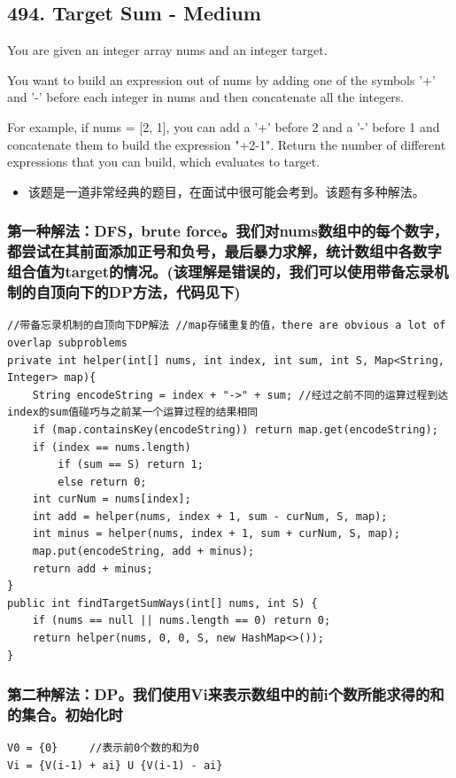 \documentclass[9pt, b5paper]{article}
\begin{document}
\subsection{494. Target Sum - Medium}
\label{sec-4-35}
You are given an integer array nums and an integer target.

You want to build an expression out of nums by adding one of the symbols '+' and '-' before each integer in nums and then concatenate all the integers.

For example, if nums = [2, 1], you can add a '+' before 2 and a '-' before 1 and concatenate them to build the expression "+2-1".
Return the number of different expressions that you can build, which evaluates to target.
\begin{itemize}
\item 该题是一道非常经典的题目，在面试中很可能会考到。该题有多种解法。
\end{itemize}
\subsubsection{第一种解法：DFS，brute force。我们对nums数组中的每个数字，都尝试在其前面添加正号和负号，最后暴力求解，统计数组中各数字组合值为target的情况。(该理解是错误的，我们可以使用带备忘录机制的自顶向下的DP方法，代码见下)}
\label{sec-4-35-1}
\begin{verbatim}
//带备忘录机制的自顶向下DP解法 //map存储重复的值，there are obvious a lot of overlap subproblems
private int helper(int[] nums, int index, int sum, int S, Map<String, Integer> map){ 
    String encodeString = index + "->" + sum; //经过之前不同的运算过程到达index的sum值碰巧与之前某一个运算过程的结果相同
    if (map.containsKey(encodeString)) return map.get(encodeString);
    if (index == nums.length)
        if (sum == S) return 1;
        else return 0;
    int curNum = nums[index];
    int add = helper(nums, index + 1, sum - curNum, S, map);
    int minus = helper(nums, index + 1, sum + curNum, S, map);
    map.put(encodeString, add + minus);
    return add + minus;
}
public int findTargetSumWays(int[] nums, int S) {
    if (nums == null || nums.length == 0) return 0;
    return helper(nums, 0, 0, S, new HashMap<>());
}
\end{verbatim}

\subsubsection{第二种解法：DP。我们使用Vi来表示数组中的前i个数所能求得的和的集合。初始化时}
\label{sec-4-35-2}
\begin{verbatim}
V0 = {0}     //表示前0个数的和为0
Vi = {V(i-1) + ai} U {V(i-1) - ai}
\end{verbatim}
\end{document}
